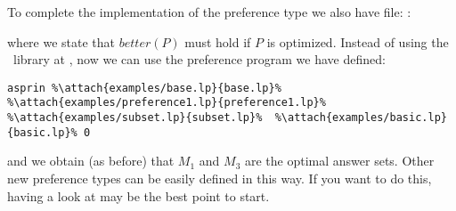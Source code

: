 To complete the implementation of the preference type we also have file: 
: 

where we state that $better(P)$ must hold if $P$ is optimized. 
Instead of using the \asprin\ library at , 
now we can use the preference program we have defined:
\begin{lstlisting}[numbers=none,escapechar=\%]
asprin %\attach{examples/base.lp}{base.lp}% %\attach{examples/preference1.lp}{preference1.lp}%  %\attach{examples/subset.lp}{subset.lp}%  %\attach{examples/basic.lp}{basic.lp}% 0
\end{lstlisting}
and we obtain (as before) that $M_1$ and $M_3$ are the optimal answer sets.
Other new preference types can be easily defined in this way.  
If you want to do this, having a look at  may be the best point to start. 

